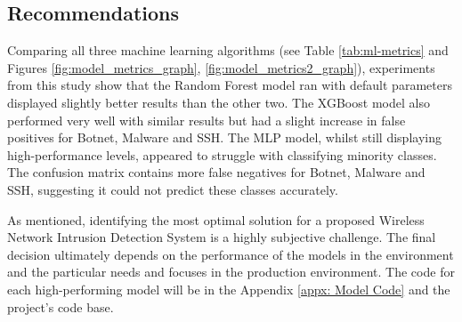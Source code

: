 \subsection{Recommendations}

Comparing all three machine learning algorithms (see Table \ref{tab:ml-metrics} and Figures \ref{fig:model_metrics_graph}, \ref{fig:model_metrics2_graph}), experiments from this study show that the Random Forest model ran with default parameters displayed slightly better results than the other two. The XGBoost model also performed very well with similar results but had a slight increase in false positives for Botnet, Malware and SSH. The MLP model, whilst still displaying high-performance levels, appeared to struggle with classifying minority classes. The confusion matrix contains more false negatives for Botnet, Malware and SSH, suggesting it could not predict these classes accurately.

As mentioned, identifying the most optimal solution for a proposed Wireless Network Intrusion Detection System is a highly subjective challenge. The final decision ultimately depends on the performance of the models in the environment and the particular needs and focuses in the production environment. The code for each high-performing model will be in the Appendix \ref{appx: Model Code} and the project's code base.